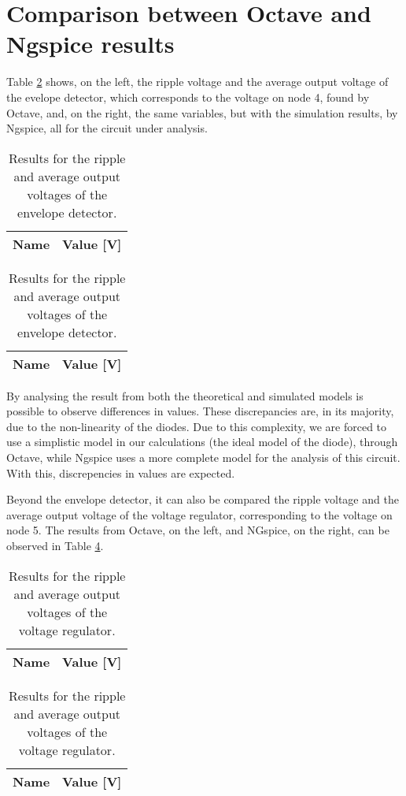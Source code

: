 \section{Comparison between Octave and Ngspice results}
\label{sec:comparison}

\par Table \ref{tab:envelope} shows, on the left, the ripple voltage and the
average output voltage of the evelope detector, which corresponds to the voltage
on node 4, found by Octave, and, on the right, the same variables, but with the
simulation results, by Ngspice, all for the circuit under analysis.

\begin{table}[htb!]
  \centering
  \begin{tabular}{|l|r|}
      \hline    
      {\bf Name} & {\bf Value [V]} \\ \hline
      
  \end{tabular}
\quad
  \begin{tabular}{|l|r|}
    \hline    
    {\bf Name} & {\bf Value [V]} \\ \hline
    
  \end{tabular}
  \caption{Results for the ripple and average output voltages of the envelope detector.}
  \label{tab:envelope}
\end{table}

\par By analysing the result from both the theoretical and simulated models is possible
to observe differences in values. These discrepancies are, in its majority, due to the
non-linearity of the diodes. Due to this complexity, we are forced to use a simplistic
model in our calculations (the ideal model of the diode), through Octave, while Ngspice uses a more complete model for
the analysis of this circuit. With this, discrepencies in values are expected.

\par Beyond the envelope detector, it can also be compared the ripple voltage and the
average output voltage of the voltage regulator, corresponding to the voltage on node
5. The results from Octave, on the left, and NGspice, on the right, can be observed in
Table \ref{tab:regulator}.

\begin{table}[htb!]
  \centering
  \begin{tabular}{|l|r|}
      \hline    
      {\bf Name} & {\bf Value [V]} \\ \hline
      
  \end{tabular}
\quad
  \begin{tabular}{|l|r|}
    \hline    
    {\bf Name} & {\bf Value [V]} \\ \hline
    
  \end{tabular}
  \caption{Results for the ripple and average output voltages of the voltage regulator.}
  \label{tab:regulator}
\end{table}

